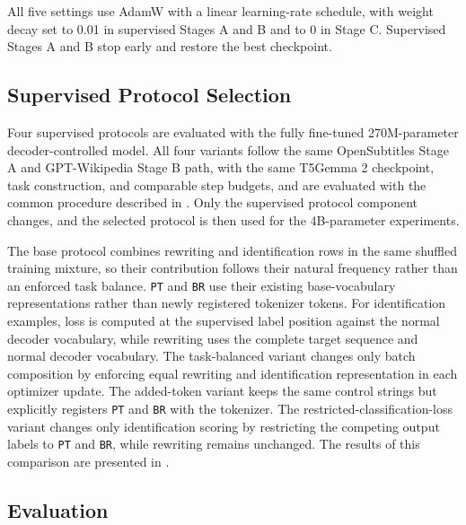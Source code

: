 \documentclass[acmtog,nonacm]{acmart}
\begin{document}
All five settings use AdamW \citep{Loshchilov2017DecoupledWD} with a linear learning-rate schedule, with weight
decay set to 0.01 in supervised Stages A and B and to 0 in Stage C. Supervised Stages A and B stop early and restore the best checkpoint.

\subsection{Supervised Protocol Selection}
\label{sec:method-protocol-selection}

Four supervised protocols are evaluated with the fully fine-tuned
270M-parameter decoder-controlled model. All four variants follow the same
OpenSubtitles Stage A and GPT-Wikipedia Stage B path, with the same T5Gemma 2
checkpoint, task construction, and comparable step budgets, and are evaluated
with the common procedure described in . Only the supervised protocol component changes, and the selected protocol is then used for the 4B-parameter experiments.

The base protocol combines rewriting and identification rows in the same
shuffled training mixture, so their contribution follows their natural
frequency rather than an enforced task balance. \texttt{PT} and \texttt{BR}
use their existing base-vocabulary representations rather than newly registered
tokenizer tokens. For identification examples, loss is computed at the
supervised label position against the normal decoder vocabulary, while
rewriting uses the complete target sequence and normal decoder vocabulary. The
task-balanced variant changes only batch composition by enforcing equal
rewriting and identification representation in each optimizer update. The
added-token variant keeps the same control strings but explicitly registers
\texttt{PT} and \texttt{BR} with the tokenizer. The
restricted-classification-loss variant changes only identification scoring by
restricting the competing output labels to \texttt{PT} and \texttt{BR}, while
rewriting remains unchanged. The results of this comparison are presented in
.

\subsection{Evaluation}
\label{sec:evaluation-setup-paper}
\end{document}
